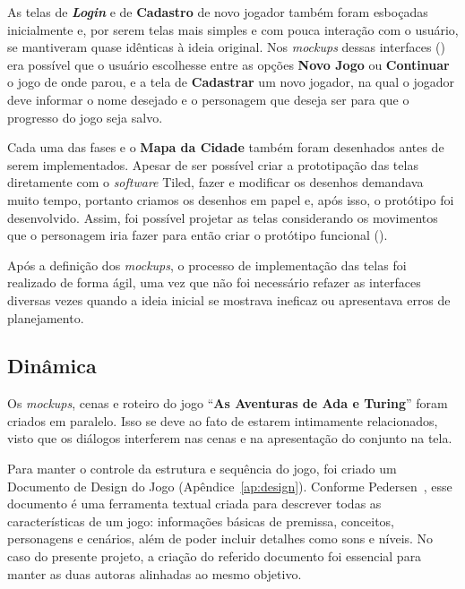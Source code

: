 As telas de \textit{\textbf{Login}} e de \textbf{Cadastro} de novo jogador também foram esboçadas inicialmente e, por serem telas mais simples e com pouca interação com o usuário, se mantiveram quase idênticas à ideia original. Nos \textit{mockups} dessas interfaces () era possível que o usuário escolhesse entre as opções \textbf{Novo Jogo} ou \textbf{Continuar} o jogo de onde parou, e a tela de \textbf{Cadastrar} um novo jogador, na qual o jogador deve informar o nome desejado e o personagem que deseja ser para que o progresso do jogo seja salvo.


Cada uma das fases e o \textbf{Mapa da Cidade} também foram desenhados antes de serem implementados. Apesar de ser possível criar a prototipação das telas diretamente com o \textit{software} Tiled, fazer e modificar os desenhos demandava muito tempo, portanto criamos os desenhos em papel e, após isso, o protótipo foi desenvolvido. Assim, foi possível projetar as telas considerando os movimentos que o personagem iria fazer para então criar o protótipo funcional ().



Após a definição dos \textit{mockups}, o processo de implementação das telas foi realizado de forma ágil, uma vez que não foi necessário refazer as interfaces diversas vezes quando a ideia inicial se mostrava ineficaz ou apresentava erros de planejamento.

\subsection{Dinâmica} \label{ssec:dinamica}

Os \textit{mockups}, cenas e roteiro do jogo “\textbf{As Aventuras de Ada e Turing}” foram criados em paralelo. Isso se deve ao fato de estarem intimamente relacionados, visto que os diálogos interferem nas cenas e na apresentação do conjunto na tela. 

Para manter o controle da estrutura e sequência do jogo, foi criado um Documento de Design do Jogo (Apêndice~\ref{ap:design}). Conforme Pedersen~\cite{pedersen2009game}, esse documento é uma ferramenta textual criada para descrever todas as características de um jogo: informações básicas de premissa, conceitos, personagens e cenários, além de poder incluir detalhes como sons e níveis. No caso do presente projeto, a criação do referido documento foi essencial para manter as duas autoras alinhadas ao mesmo objetivo.

